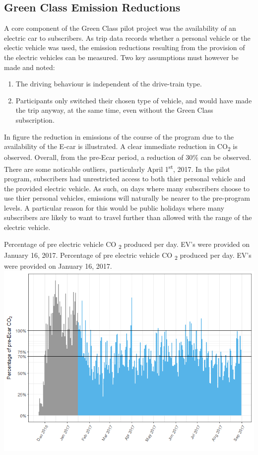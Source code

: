 \subsection{Green Class Emission Reductions}
A core component of the Green Class pilot project was the availability of an electric car to subscribers. 
As trip data records whether a personal vehicle or the electic vehicle was used, the emission reductions resulting from the provision of the electric vehicles can be measured. Two key assumptions must however be made and noted:
\begin{enumerate}
  \item The driving behaviour is independent of the drive-train type.
  \item Participants only switched their chosen type of vehicle, and would have made the trip anyway, at the same time, even without the Green Class subscription.
  \end{enumerate}

In figure \cite{fig:green-class-reduction} the reduction in emissions of the course of the program due to the availability of the E-car is illustrated. 
A clear immediate reduction in CO\textsubscript{2} is observed. Overall, from the pre-Ecar period, a reduction of 30\% can be observed. 
There are some noticable outliers, particularly April 1\textsuperscript{st}, 2017. 
In the pilot program, subscribers had unrestricted access to both thier personal vehicle and the provided electric vehicle. 
As such, on days where many subscribers choose to use thier personal vehicles, emissions will naturally be nearer to the pre-program levels. 
A particular reason for this would be public holidays where many subscribers are likely to want to travel further than allowed with the range of the electric vehicle.

\createfigure%
{Percentage of pre electric vehicle CO \textsubscript{2} produced per day. EV's were provided on January 16, 2017. }%
{Percentage of pre electric vehicle CO \textsubscript{2} produced per day. EV's were provided on January 16, 2017. }%
{\label{fig:green-class-reduction}}%
{\includegraphics[width=1.0\textwidth, angle=0]{figures/green_class_pollutant_reductions_daily}}%
{}

